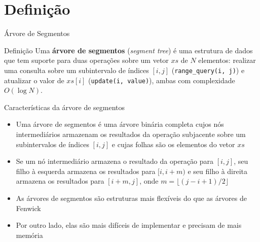 \section{Definição}

\begin{frame}[fragile]{Árvore de Segmentos}

    \begin{block}{Definição}
        Uma \textbf{árvore de segmentos} (\textit{segment tree}) é uma estrutura de dados que
        tem suporte para duas operações sobre um vetor $xs$ de $N$ elementos: realizar uma consulta
        sobre um subintervalo de índices $[i, j]$ (\texttt{range\_query(i, j)}) e atualizar o valor 
        de $xs[i]$ (\texttt{update(i, value)}), ambas com complexidade $O(\log N)$.
    \end{block}

\end{frame}

\begin{frame}[fragile]{Características da árvore de segmentos}

    \begin{itemize}
        \item Uma árvore de segmentos é uma árvore binária completa cujos nós intermediários 
            armazenam
            os resultados da operação subjacente sobre um  subintervalos de índices $[i, j]$ e 
            cujas folhas são os elementos do vetor $xs$

        \item Se um nó intermediário armazena o resultado da operação para $[i, j]$, seu filho
            à esquerda armazena os resultados para $[i, i + m)$ e seu filho à direita armazena
            os resultados para $[i + m, j]$, onde $m = \lfloor (j - i + 1)/2 \rfloor$

        \item As árvores de segmentos são estruturas mais flexíveis do que as árvores de Fenwick

        \item Por outro lado, elas são mais difíceis de implementar e precisam de mais memória
    \end{itemize}

\end{frame}

